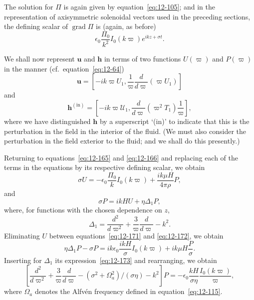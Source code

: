 The solution for $\Pi$ is again given by equation~\eqref{eq:12-105}; and in the representation of axisymmetric solenoidal vectors used in the preceding sections, the defining scalar of $\operatorname{grad}\Pi$ is (again, as before)
\begin{equation}
\label{eq:12-168}
\epsilon_0 \frac{\Pi_0}{k^2}I_0(k\varpi)e^{ikz+\sigma t}.
\end{equation}

We shall now represent $\mathbf{u}$ and $\mathbf{h}$ in terms of two functions $U(\varpi)$ and $P(\varpi)$ in the manner (cf.\ equation~\eqref{eq:12-64})
\begin{equation}
\label{eq:12-169}
\mathbf{u} = [-ik\varpi U_1, \frac{1}{\varpi}\frac{d}{d\varpi}(\varpi U_1)]
\end{equation}
and
\begin{equation}
\label{eq:12-170}
\mathbf{h}^{(\mathrm{in})} = [-ik\varpi \mathcal{U}_1, \frac{d}{d\varpi}(\varpi^2 T_1)\frac{1}{\varpi}],
\end{equation}
where we have distinguished $\mathbf{h}$ by a superscript `(in)' to indicate that this is the perturbation in the field in the interior of the fluid. (We must also consider the perturbation in the field exterior to the fluid; and we shall do this presently.)

Returning to equations~\eqref{eq:12-165} and \eqref{eq:12-166} and replacing each of the terms in the equations by its respective defining scalar, we obtain
\begin{equation}
\label{eq:12-171}
\sigma U = -\epsilon_0 \frac{\Pi_0}{k} I_0(k\varpi) + \frac{ik\mu H}{4\pi\rho}P,
\end{equation}
and
\begin{equation}
\label{eq:12-172}
\sigma P = ikHU + \eta\Delta_1 P,
\end{equation}
where, for functions with the chosen dependence on $z$,
\begin{equation}
\label{eq:12-173}
\Delta_1 = \frac{d^2}{d\varpi^2} + \frac{3}{\varpi}\frac{d}{d\varpi} - k^2.
\end{equation}
Eliminating $U$ between equations~\eqref{eq:12-171} and \eqref{eq:12-172}, we obtain
\begin{equation}
\label{eq:12-174}
\eta\Delta_1 P - \sigma P = ik\epsilon_0\frac{ikH}{\sigma}I_0(k\varpi) + ik\mu H\frac{P}{\sigma}.
\end{equation}
Inserting for $\Delta_1$ its expression~\eqref{eq:12-173} and rearranging, we obtain
\begin{equation}
\label{eq:12-175}
\left[\frac{d^2}{d\varpi^2} + \frac{3}{\varpi}\frac{d}{d\varpi} - (\sigma^2 + \Omega_a^2)/(\sigma\eta) - k^2\right]P = -\epsilon_0 \frac{kH}{\sigma\eta}\frac{I_0(k\varpi)}{\varpi},
\end{equation}
where $\Omega_a$ denotes the Alfv\'en frequency defined in equation~\eqref{eq:12-115}.

